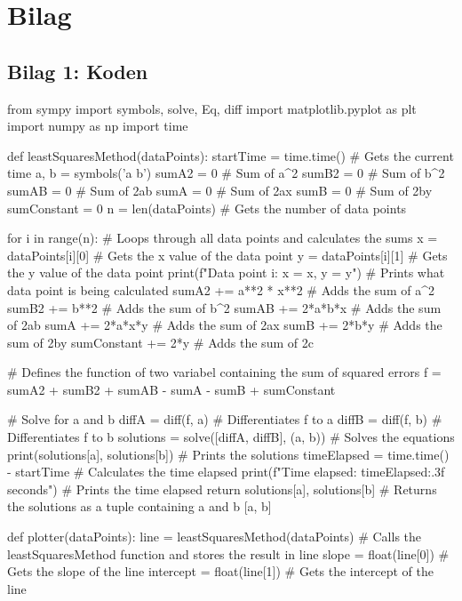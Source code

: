 \newpage

\section{Bilag}\label{sec:Bilag}
\subsection{Bilag 1: Koden}\label{sec:koden}
\begin{python}
    from sympy import symbols, solve, Eq, diff
import matplotlib.pyplot as plt
import numpy as np 
import time

def leastSquaresMethod(dataPoints):
    startTime = time.time() # Gets the current time
    a, b = symbols('a b')
    sumA2 = 0 # Sum of a^2 
    sumB2 = 0 # Sum of b^2
    sumAB = 0 # Sum of 2ab
    sumA = 0 # Sum of 2ax
    sumB = 0 # Sum of 2by
    sumConstant = 0
    n = len(dataPoints) # Gets the number of data points

    for i in range(n): # Loops through all data points and calculates the sums
        x = dataPoints[i][0] # Gets the x value of the data point
        y = dataPoints[i][1] # Gets the y value of the data point
        print(f"Data point {i}: x = {x}, y = {y}") # Prints what data point is being calculated
        sumA2 += a**2 * x**2 # Adds the sum of a^2
        sumB2 += b**2      # Adds the sum of b^2
        sumAB += 2*a*b*x   # Adds the sum of 2ab
        sumA += 2*a*x*y   # Adds the sum of 2ax
        sumB += 2*b*y    # Adds the sum of 2by
        sumConstant += 2*y # Adds the sum of 2c

    # Defines the function of two variabel containing the sum of squared errors
    f = sumA2 + sumB2 + sumAB - sumA - sumB + sumConstant 

    # Solve for a and b
    diffA = diff(f, a) # Differentiates f to a
    diffB = diff(f, b) # Differentiates f to b
    solutions = solve([diffA, diffB], (a, b)) # Solves the equations
    print(solutions[a], solutions[b]) # Prints the solutions
    timeElapsed = time.time() - startTime # Calculates the time elapsed
    print(f"Time elapsed: {timeElapsed:.3f} seconds") # Prints the time elapsed
    return solutions[a], solutions[b] # Returns the solutions as a tuple containing a and b [a, b]

def plotter(dataPoints):
    line = leastSquaresMethod(dataPoints) # Calls the leastSquaresMethod function and stores the result in line
    slope = float(line[0])  # Gets the slope of the line
    intercept = float(line[1])  # Gets the intercept of the line
    

\end{python}
